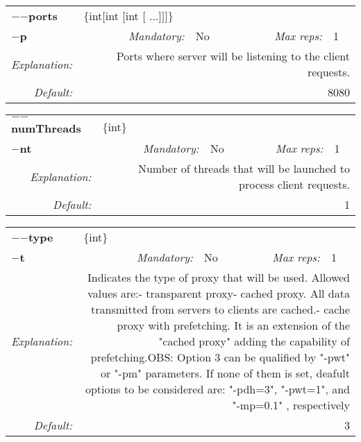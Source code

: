 \begin{center}\begin{tabular}{|rr|rl|rl|}
\hline
\multicolumn{2}{|l|}{\textbf{$-$$-$ports}} & \multicolumn{4}{|l|}{$\{$int$[$int $[$int $[$ ...$]$$]$$]$$\}$} \\
\cline{3-6}
\multicolumn{2}{|l|}{\textbf{$-$p}} & \emph{Mandatory:} & No & \emph{Max reps:} & 1 \\
\hline
\emph{Explanation:} & \multicolumn{5}{|p{12cm}|}{Ports where server will be listening to the client requests.} \\
\hline
\emph{Default:} & \multicolumn{5}{|p{12cm}|}{8080} \\
\hline
\end{tabular}\end{center}
\begin{center}\begin{tabular}{|rr|rl|rl|}
\hline
\multicolumn{2}{|l|}{\textbf{$-$$-$numThreads}} & \multicolumn{4}{|l|}{$\{$int$\}$} \\
\cline{3-6}
\multicolumn{2}{|l|}{\textbf{$-$nt}} & \emph{Mandatory:} & No & \emph{Max reps:} & 1 \\
\hline
\emph{Explanation:} & \multicolumn{5}{|p{12cm}|}{Number of threads that will be launched to process client requests.} \\
\hline
\emph{Default:} & \multicolumn{5}{|p{12cm}|}{1} \\
\hline
\end{tabular}\end{center}
\begin{center}\begin{tabular}{|rr|rl|rl|}
\hline
\multicolumn{2}{|l|}{\textbf{$-$$-$type}} & \multicolumn{4}{|l|}{$\{$int$\}$} \\
\cline{3-6}
\multicolumn{2}{|l|}{\textbf{$-$t}} & \emph{Mandatory:} & No & \emph{Max reps:} & 1 \\
\hline
\emph{Explanation:} & \multicolumn{5}{|p{12cm}|}{Indicates the type of proxy that will be used. Allowed values are:\newline	1- transparent proxy\newline	2- cached proxy. All data transmitted from servers to clients are cached.\newline	3- cache proxy with prefetching. It is an extension of the "cached proxy" adding the capability of prefetching.\newline OBS: Option 3 can be qualified by "-pwt" or "-pm" parameters. If none of them is set, deafult options to be considered are: "-pdh=3", "-pwt=1", and "-mp=0.1" , respectively} \\
\hline
\emph{Default:} & \multicolumn{5}{|p{12cm}|}{3} \\
\hline
\end{tabular}\end{center}
